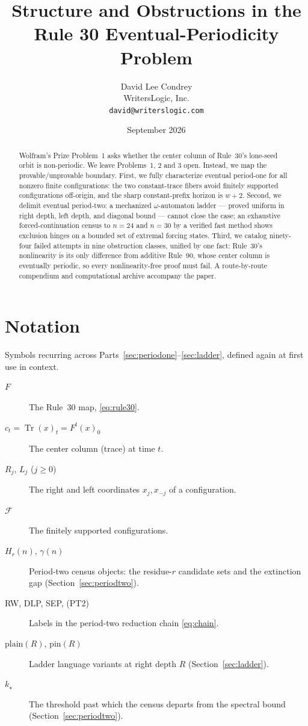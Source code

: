 \documentclass[11pt]{article}
\title{\vspace{-2em}Structure and Obstructions in the\\Rule 30 Eventual-Periodicity Problem}
\author{David Lee Condrey\\WritersLogic, Inc.\\\texttt{david@writerslogic.com}}
\date{September 2026}
\theoremstyle{definition}
\newcommand{\F}{\mathcal F}
\newcommand{\Tr}{\operatorname{Tr}}
\newcommand{\gm}{\gamma}
\begin{document}
\maketitle

\begin{abstract}
Wolfram's Prize Problem~1 asks whether the center column of Rule~30's
lone-seed orbit is non-periodic. We leave Problems~1, 2 and 3 open. Instead,
we map the provable/unprovable boundary. First, we fully characterize eventual
period-one for all nonzero finite configurations: the two constant-trace
fibers avoid finitely supported configurations off-origin, and the sharp
constant-prefix horizon is $w+2$. Second, we delimit eventual period-two: a
mechanized $\omega$-automaton ladder --- proved uniform in right depth, left
depth, and diagonal bound --- cannot close the case; an exhaustive
forced-continuation census to $n=24$ and $n=30$ by a verified fast method
shows exclusion hinges on a bounded set of extremal forcing states. Third, we
catalog ninety-four failed attempts in nine obstruction classes, unified by
one fact: Rule~30's nonlinearity is its only difference from additive
Rule~90, whose center column is eventually periodic, so every
nonlinearity-free proof must fail. A route-by-route compendium and
computational archive accompany the paper.
\end{abstract}

\tableofcontents

\section{Notation}
\label{sec:notation}

Symbols recurring across Parts~\ref{sec:periodone}--\ref{sec:ladder}, defined
again at first use in context.

\begin{description}
\item[$F$] The Rule~30 map, \eqref{eq:rule30}.
\item[$c_t=\Tr(x)_t=F^t(x)_0$] The center column (trace) at time $t$.
\item[$R_j,\,L_j$ ($j\ge0$)] The right and left coordinates $x_j,x_{-j}$ of a
configuration.
\item[$\F$] The finitely supported configurations.
\item[$H_r(n)$, $\gm(n)$] Period-two census objects: the residue-$r$ candidate
sets and the extinction gap (Section~\ref{sec:periodtwo}).
\item[RW, DLP, SEP, (PT2)] Labels in the period-two reduction chain
\eqref{eq:chain}.
\item[$\mathrm{plain}(R)$, $\mathrm{pin}(R)$] Ladder language variants at right
depth $R$ (Section~\ref{sec:ladder}).
\item[$k_\star$] The threshold past which the census departs from the spectral
bound (Section~\ref{sec:periodtwo}).
\end{description}
\end{document}
